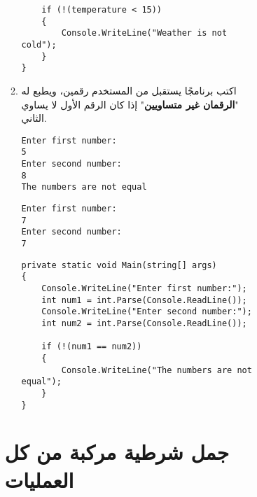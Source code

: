 \documentclass[12pt]{article}
\begin{document}
\begin{enumerate}[itemsep=3em]
\begin{enumerate}[itemsep=3em]
\begin{enumerate}[itemsep=3em]
\begin{enumerate}[itemsep=3em]
\begin{enumerate}[itemsep=3em]
\begin{enumerate}[itemsep=3em]
\begin{enumerate}
\begin{solution}
\begin{english}
\begin{lstlisting}
    if (!(temperature < 15))
    {
        Console.WriteLine("Weather is not cold");
    }
}
\end{lstlisting}
\end{english}
\end{solution}
\clearpage
\fi
\fi

\item
اكتب برنامجًا يستقبل من المستخدم رقمين، ويطبع له "\textbf{الرقمان غير متساويين}" إذا كان الرقم الأول لا يساوي الثاني.
\ifdetailed
\begin{example}[1]
\begin{english}
\begin{lstlisting}
Enter first number:
5
Enter second number:
8
The numbers are not equal
\end{lstlisting}
\end{english}
\end{example}
\begin{example}[2]
\begin{english}
\begin{lstlisting}
Enter first number:
7
Enter second number:
7
\end{lstlisting}
\end{english}
\end{example}

\ifwithsols
\begin{solution}
\begin{english}
\begin{lstlisting}
private static void Main(string[] args)
{
    Console.WriteLine("Enter first number:");
    int num1 = int.Parse(Console.ReadLine());
    Console.WriteLine("Enter second number:");
    int num2 = int.Parse(Console.ReadLine());

    if (!(num1 == num2))
    {
        Console.WriteLine("The numbers are not equal");
    }
}
\end{lstlisting}
\end{english}
\end{solution}
\clearpage
\fi
\fi

\end{enumerate}

\section{جمل شرطية مركبة من كل العمليات}

\ifdetailed
\begin{enumerate}[itemsep=3em]
\else
\begin{enumerate}
\fi


\end{enumerate}
\end{enumerate}
\end{enumerate}
\end{enumerate}
\end{enumerate}
\end{enumerate}
\end{enumerate}
\end{enumerate}
\end{document}
